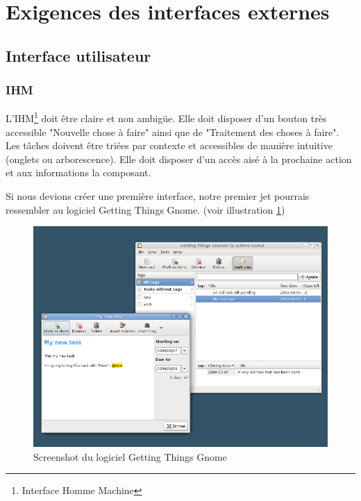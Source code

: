 \section{Exigences des interfaces externes}
	\subsection{Interface utilisateur}

\subsubsection{IHM}
L'IHM\footnote{Interface Homme Machine} doit être claire et non ambigüe.
Elle doit disposer d'un bouton très accessible "Nouvelle chose à faire" ainsi que de "Traitement des choses à faire".
Les tâches doivent être triées par contexte et accessibles de manière intuitive (onglets ou arborescence).
Elle doit disposer d'un accès aisé à la prochaine action et aux informations la composant.

Si nous devions créer une première interface, notre premier jet pourrais ressembler au logiciel Getting Things Gnome\cite{gettingThingsGnome}. (voir illustration \ref{gettingThingsGnome})

\begin{figure}[!ht]
\begin{center}
\includegraphics[width=12cm]{images/gettingThingsGnome.png}
\caption{Screenshot du logiciel Getting Things Gnome}
\label{gettingThingsGnome}
\end{center}
\end{figure}


